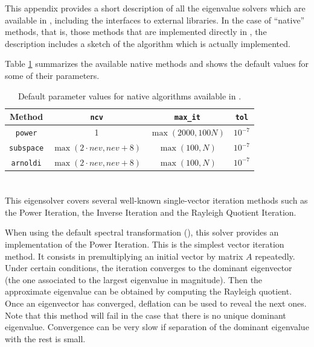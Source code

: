 	This appendix provides a short description of all the eigenvalue solvers which are available in \slepc, including the interfaces to external libraries. In the case of ``native'' methods, that is, those methods that are implemented directly in \slepc, the description includes a sketch of the algorithm which is actually implemented.

	Table \ref{tab:defaults} summarizes the available native methods and shows the default values for some of their parameters.
\begin{table}[ht]
\centering
\begin{tabular}{cccc} \hline
Method   & \texttt{ncv} & \texttt{max\_it} & \texttt{tol} \\ \hline
\texttt{power}    &  1 & $\max(2000,100N)$ & $10^{-7}$ \\ 
\texttt{subspace} &  $\max(2\cdot nev,nev+8)$ & $\max(100,N)$ & $10^{-7}$ \\ 
\texttt{arnoldi}  &  $\max(2\cdot nev,nev+8)$ & $\max(100,N)$ & $10^{-7}$ \\ 
\hline
\end{tabular}
\caption{\label{tab:defaults}Default parameter values for native algorithms available in \slepc.}
\end{table}


\section{}

This eigensolver covers several well-known single-vector iteration methods such as the Power Iteration, the Inverse Iteration and the Rayleigh Quotient Iteration.

When using the default spectral transformation (), this solver provides an implementation of the Power Iteration. This is the simplest vector iteration method. It consists in premultiplying an initial vector by matrix $A$ repeatedly. Under certain conditions, the iteration converges to the dominant eigenvector (the one associated to the largest eigenvalue in magnitude). Then the approximate eigenvalue can be obtained by computing the Rayleigh quotient. Once an eigenvector has converged, deflation can be used to reveal the next ones. Note that this method will fail in the case that there is no unique dominant eigenvalue. Convergence can be very slow if separation of the dominant eigenvalue with the rest is small.

